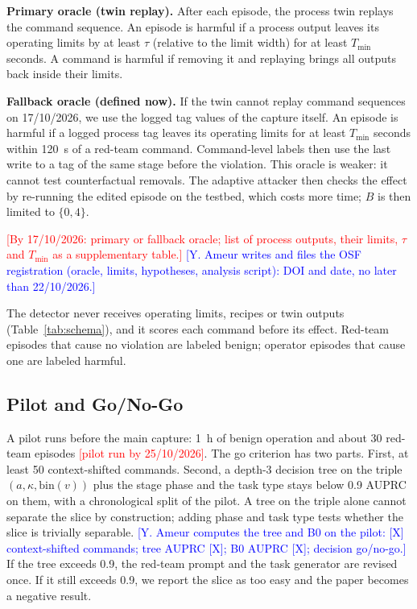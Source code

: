 \documentclass[journal]{IEEEtran}
\newcommand{\billal}[1]{\textcolor{red}{#1}}
\newcommand{\yulliwas}[1]{\textcolor{blue}{#1}}
\begin{document}
\textbf{Primary oracle (twin replay).} After each episode, the process twin replays the command sequence. An episode is harmful if a process output leaves its operating limits by at least $\tau$ (relative to the limit width) for at least $T_{\min}$ seconds. A command is harmful if removing it and replaying brings all outputs back inside their limits.

\textbf{Fallback oracle (defined now).} If the twin cannot replay command sequences on 17/10/2026, we use the logged tag values of the capture itself. An episode is harmful if a logged process tag leaves its operating limits for at least $T_{\min}$ seconds within 120~s of a red-team command. Command-level labels then use the last write to a tag of the same stage before the violation. This oracle is weaker: it cannot test counterfactual removals. The adaptive attacker then checks the effect by re-running the edited episode on the testbed, which costs more time; $B$ is then limited to $\{0,4\}$.

\billal{[By 17/10/2026: primary or fallback oracle; list of process outputs, their limits, $\tau$ and $T_{\min}$ as a supplementary table.]} \yulliwas{[Y. Ameur writes and files the OSF registration (oracle, limits, hypotheses, analysis script): DOI and date, no later than 22/10/2026.]}

The detector never receives operating limits, recipes or twin outputs (Table~\ref{tab:schema}), and it scores each command before its effect. Red-team episodes that cause no violation are labeled benign; operator episodes that cause one are labeled harmful.

\subsection{Pilot and Go/No-Go}
A pilot runs before the main capture: 1~h of benign operation and about 30 red-team episodes \billal{[pilot run by 25/10/2026]}. The go criterion has two parts. First, at least 50 context-shifted commands. Second, a depth-3 decision tree on the triple $(a,\kappa,\mathrm{bin}(v))$ plus the stage phase and the task type stays below 0.9 AUPRC on them, with a chronological split of the pilot. A tree on the triple alone cannot separate the slice by construction; adding phase and task type tests whether the slice is trivially separable. \yulliwas{[Y. Ameur computes the tree and B0 on the pilot: [X] context-shifted commands; tree AUPRC [X]; B0 AUPRC [X]; decision go/no-go.]} If the tree exceeds 0.9, the red-team prompt and the task generator are revised once. If it still exceeds 0.9, we report the slice as too easy and the paper becomes a negative result.
\end{document}
